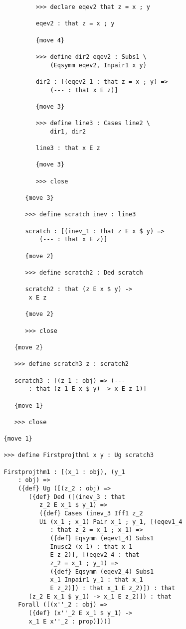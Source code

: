 \documentclass[12pt]{article}
\begin{document}
\begin{verbatim}
            >>> declare eqev2 that z = x ; y

            eqev2 : that z = x ; y

            {move 4}

            >>> define dir2 eqev2 : Subs1 \
                (Eqsymm eqev2, Inpair1 x y)

            dir2 : [(eqev2_1 : that z = x ; y) => 
                (--- : that x E z)]

            {move 3}

            >>> define line3 : Cases line2 \
                dir1, dir2

            line3 : that x E z

            {move 3}

            >>> close

         {move 3}

         >>> define scratch inev : line3

         scratch : [(inev_1 : that z E x $ y) => 
             (--- : that x E z)]

         {move 2}

         >>> define scratch2 : Ded scratch

         scratch2 : that (z E x $ y) -> 
          x E z

         {move 2}

         >>> close

      {move 2}

      >>> define scratch3 z : scratch2

      scratch3 : [(z_1 : obj) => (--- 
          : that (z_1 E x $ y) -> x E z_1)]

      {move 1}

      >>> close

   {move 1}

   >>> define Firstprojthm1 x y : Ug scratch3

   Firstprojthm1 : [(x_1 : obj), (y_1 
       : obj) => 
       ({def} Ug ([(z_2 : obj) => 
          ({def} Ded ([(inev_3 : that 
             z_2 E x_1 $ y_1) => 
             ({def} Cases (inev_3 Iff1 z_2 
             Ui (x_1 ; x_1) Pair x_1 ; y_1, [(eqev1_4 
                : that z_2 = x_1 ; x_1) => 
                ({def} Eqsymm (eqev1_4) Subs1 
                Inusc2 (x_1) : that x_1 
                E z_2)], [(eqev2_4 : that 
                z_2 = x_1 ; y_1) => 
                ({def} Eqsymm (eqev2_4) Subs1 
                x_1 Inpair1 y_1 : that x_1 
                E z_2)]) : that x_1 E z_2)]) : that 
          (z_2 E x_1 $ y_1) -> x_1 E z_2)]) : that 
       Forall ([(x''_2 : obj) => 
          ({def} (x''_2 E x_1 $ y_1) -> 
          x_1 E x''_2 : prop)]))]


\end{verbatim}
\end{document}
